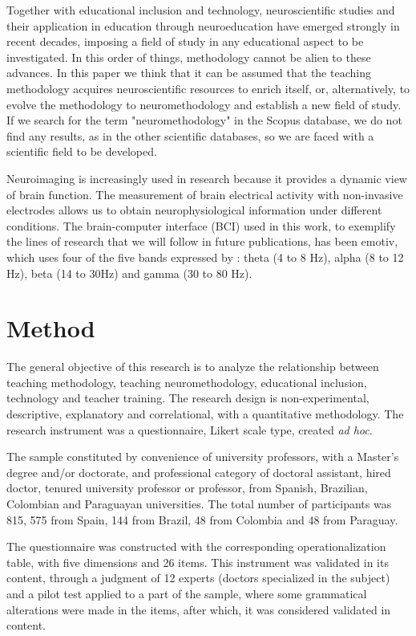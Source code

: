 \documentclass[english]{textolivre}
\begin{document}
Together with educational inclusion and technology, neuroscientific studies and their application in education through neuroeducation have emerged strongly in recent decades, imposing a field of study in any educational aspect to be investigated. In this order of things, methodology cannot be alien to these advances. In this paper we think that it can be assumed that the teaching methodology acquires neuroscientific resources to enrich itself, or, alternatively, to evolve the methodology to neuromethodology and establish a new field of study. If we search for the term "neuromethodology" in the Scopus database, we do not find any results, as in the other scientific databases, so we are faced with a scientific field to be developed.

Neuroimaging is increasingly used in research because it provides a dynamic view of brain function. The measurement of brain electrical activity with non-invasive electrodes allows us to obtain neurophysiological information under different conditions. The brain-computer interface (BCI) used in this work, to exemplify the lines of research that we will follow in future publications, has been emotiv, which uses four of the five bands expressed by \textcite{cardinali_neurociencia_2007}: theta (4 to 8 Hz), alpha (8 to 12 Hz), beta (14 to 30Hz) and gamma (30 to 80 Hz).

\section{Method}\label{sec-normas}
The general objective of this research is to analyze the relationship between teaching methodology, teaching neuromethodology, educational inclusion, technology and teacher training. The research design is non-experimental, descriptive, explanatory and correlational, with a quantitative methodology. The research instrument was a questionnaire, Likert scale type, created \textit{ad hoc}.

The sample constituted by convenience of university professors, with a Master's degree and/or doctorate, and professional category of doctoral assistant, hired doctor, tenured university professor or professor, from Spanish, Brazilian, Colombian and Paraguayan universities. The total number of participants was 815, 575 from Spain, 144 from Brazil, 48 from Colombia and 48 from Paraguay.

The questionnaire was constructed with the corresponding operationalization table, with five dimensions and 26 items. This instrument was validated in its content, through a judgment of 12 experts (doctors specialized in the subject) and a pilot test applied to a part of the sample, where some grammatical alterations were made in the items, after which, it was considered validated in content.
\end{document}
